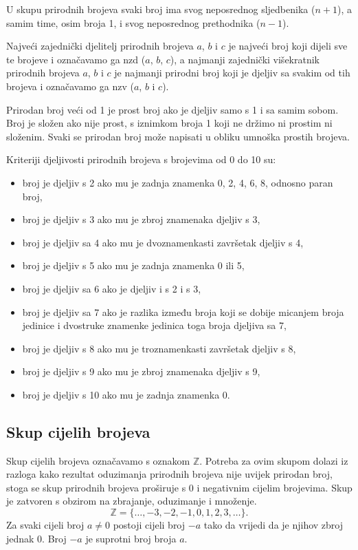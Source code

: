 U skupu prirodnih brojeva svaki broj ima svog neposrednog sljedbenika ($n+1$), a samim time, osim broja 1, i svog neposrednog prethodnika ($n-1$).

Najveći zajednički djelitelj prirodnih brojeva $a$, $b$ i $c$ je najveći broj koji dijeli sve te brojeve i označavamo ga nzd ($a$, $b$, $c$), a najmanji zajednički višekratnik prirodnih brojeva $a$, $b$ i $c$ je najmanji prirodni broj koji je djeljiv sa svakim od tih brojeva i označavamo ga nzv ($a$, $b$ i $c$).

Prirodan broj veći od 1 je prost broj ako je djeljiv samo s 1 i sa samim sobom.
Broj je složen ako nije prost, s iznimkom broja 1 koji ne držimo ni prostim ni složenim.
Svaki se prirodan broj može napisati u obliku umnoška prostih brojeva.

Kriteriji djeljivosti prirodnih brojeva s brojevima od 0 do 10 su:
\begin{itemize}
  \item broj je djeljiv s 2 ako mu je zadnja znamenka 0, 2, 4, 6, 8, odnosno paran broj,
  \item broj je djeljiv s 3 ako mu je zbroj znamenaka djeljiv s 3,
  \item broj je djeljiv sa 4 ako mu je dvoznamenkasti završetak djeljiv s 4,
  \item broj je djeljiv s 5 ako mu je zadnja znamenka 0 ili 5,
  \item broj je djeljiv sa 6 ako je djeljiv i s 2 i s 3,
  \item broj je djeljiv sa 7 ako je razlika između broja koji se dobije micanjem broja jedinice i dvostruke znamenke jedinica toga broja djeljiva sa 7,
  \item broj je djeljiv s 8 ako mu je troznamenkasti završetak djeljiv s 8,
  \item broj je djeljiv s 9 ako mu je zbroj znamenaka djeljiv s 9,
  \item broj je djeljiv s 10 ako mu je zadnja znamenka 0.
\end{itemize}

\subsection{Skup cijelih brojeva}\label{subsec:skup-cijelih-brojeva}
Skup cijelih brojeva označavamo s oznakom $\mathbb{Z}$.
Potreba za ovim skupom dolazi iz razloga kako rezultat oduzimanja prirodnih brojeva nije uvijek prirodan broj, stoga se skup prirodnih brojeva proširuje s 0 i negativnim cijelim brojevima.
Skup je zatvoren s obzirom na zbrajanje, oduzimanje i množenje.
\[ \mathbb{Z}=\{\ldots,-3,-2,-1,0,1,2,3,\ldots\}. \]
Za svaki cijeli broj $a \neq 0$ postoji cijeli broj $-a$ tako da vrijedi da je njihov zbroj jednak 0.
Broj $-a$ je suprotni broj broja $a$.

